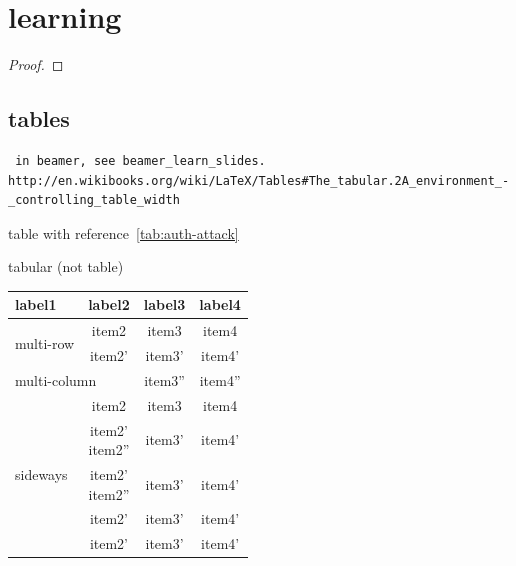 \section{learning}

\begin{theorem}
\end{theorem}
\begin{proof}
\end{proof}

\subsection{tables}

{\scriptsize \begin{verbatim} in beamer, see beamer_learn_slides. http://en.wikibooks.org/wiki/LaTeX/Tables#The_tabular.2A_environment_-_controlling_table_width
\end{verbatim}}

table with reference~\ref{tab:auth-attack}


\begin{table}[!htbp] %
\caption{Example of authorized searcher attack}
\label{tab:auth-attack}
\end{table}

tabular (not table)

\begin{tabularx}{0.4\textwidth}{ |X|c|c|c| } %
  \hline
  label1                    & label2 & label3 & label4 \\ \hline
  \multirow{2}{*}{multi-row} 
                             & item2  & item3  & item4  \\ \cline{2-4}
                             & item2'  & item3'  & item4'  \\ \hline
  \multicolumn{2}{|l|}{multi-column}   & item3''  & item4''  \\  \hline
  \multirow{5}{*}{\begin{sideways}sideways\end{sideways}}
                             & item2  & item3  & item4  \\ \cline{2-4}
                             & \shortstack[l]{item2'\\item2''}  & item3'  & item4'  \\ \cline{2-4}
                             & \shortstack[r]{item2'\\item2''}  & item3'  & item4'  \\ \cline{2-4}
                             & item2'  & item3'  & item4'  \\ \cline{2-4}
                             & item2'  & item3'  & item4'  \\ \hline
\end{tabularx}

